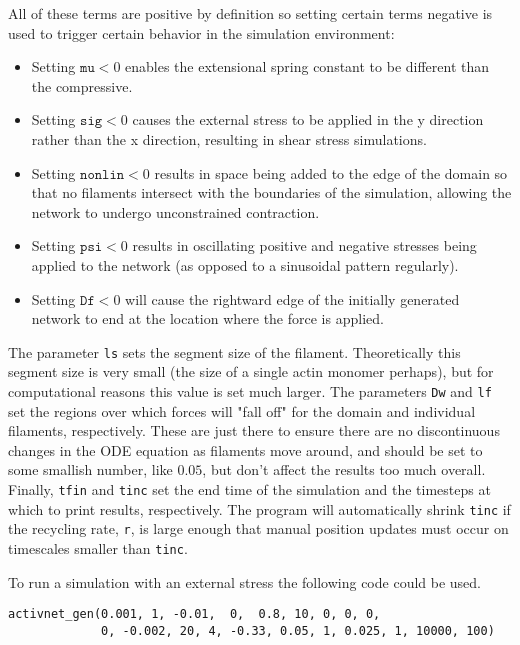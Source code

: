 All of these terms are positive by definition so setting certain terms negative is used to trigger certain behavior in the simulation environment:
\begin{itemize}
	\item  Setting $\texttt{mu} < 0$ enables the extensional spring constant to be different than the compressive.
	\item  Setting $\texttt{sig} < 0$ causes the external stress to be applied in the y direction rather than the x direction, resulting in shear stress simulations.
	\item Setting $\texttt{nonlin} < 0$ results in space being added to the edge of the domain so that no filaments intersect with the boundaries of the simulation, allowing the network to undergo unconstrained contraction.
	\item Setting $\texttt{psi} < 0$ results in oscillating positive and negative stresses being applied to the network (as opposed to a sinusoidal pattern regularly).
	\item Setting $\texttt{Df} < 0$ will cause the rightward edge of the initially generated network to end at the location where the force is applied.
\end{itemize}
   
The parameter \texttt{ls} sets the segment size of the filament.  Theoretically this segment size is very small (the size of a single actin monomer perhaps), but for computational reasons this value is set much larger.  The parameters \texttt{Dw} and \texttt{lf} set the regions over which forces will "fall off" for the domain and individual filaments, respectively.  These are just there to ensure there are no discontinuous changes in the ODE equation as filaments move around, and should be set to some smallish number, like $0.05$, but don't affect the results too much overall.  Finally, \texttt{tfin} and \texttt{tinc} set the end time of the simulation and the timesteps at which to print results, respectively.  The program will automatically shrink \texttt{tinc} if the recycling rate, \texttt{r}, is large enough that manual position updates must occur on timescales smaller than \texttt{tinc}.


To run a simulation with an external stress the following code could be used.

\begin{verbatim}
activnet_gen(0.001, 1, -0.01,  0,  0.8, 10, 0, 0, 0, 
             0, -0.002, 20, 4, -0.33, 0.05, 1, 0.025, 1, 10000, 100)
\end{verbatim}

